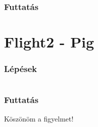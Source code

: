 \documentclass{beamer}
\begin{document}


\begin{frame}
\frametitle{Futtatás}

\end{frame}


\section{Flight2 - Pig} %

\begin{frame}
\frametitle{Lépések}
\begin{columns}[t] 
		
		
		
\end{columns}
\end{frame}


\begin{frame}
\frametitle{Futtatás}

\end{frame}



\begin{frame}[plain]
\Huge{\centerline{Köszönöm a figyelmet!}}
\end{frame}


\end{document}
